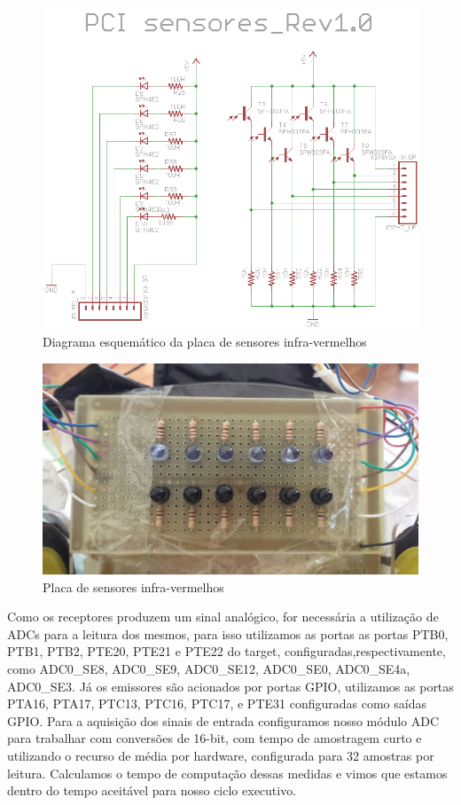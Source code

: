 \documentclass{article}
\begin{document}
\begin{figure}[H]
	\centering
	\includegraphics[width=0.9\linewidth]{sensoresEsq}
	\caption{Diagrama esquemático da placa de sensores infra-vermelhos}
	\label{fig:sensoresEsq}
\end{figure}

\begin{figure}[H]
	\centering
	\includegraphics[width=0.9\linewidth]{led.JPG}
	\caption{Placa de sensores infra-vermelhos}
	\label{fig:led}
\end{figure}
Como os receptores produzem um sinal analógico, for necessária a utilização de ADCs para a leitura dos mesmos, para isso utilizamos as portas as portas PTB0, PTB1, PTB2, PTE20, PTE21 e PTE22 do target, configuradas,respectivamente, como ADC0\_SE8, ADC0\_SE9, ADC0\_SE12, ADC0\_SE0, ADC0\_SE4a, ADC0\_SE3. Já os emissores são acionados por portas GPIO, utilizamos as portas PTA16, PTA17, PTC13, PTC16, PTC17, e PTE31 configuradas como saídas GPIO. Para a aquisição dos sinais de entrada configuramos nosso módulo ADC para trabalhar com conversões de 16-bit, com tempo de amostragem curto e utilizando o recurso de média por hardware, configurada para 32 amostras por leitura. Calculamos o tempo de computação dessas medidas e vimos que estamos dentro do tempo aceitável para nosso ciclo executivo.
\end{document}
